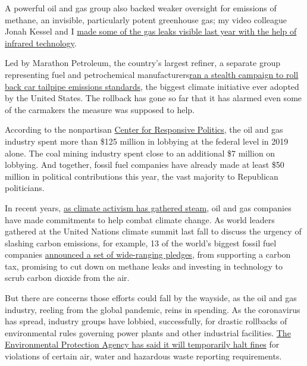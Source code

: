 A powerful oil and gas group also backed weaker oversight for emissions
of methane, an invisible, particularly potent greenhouse gas; my video
colleague Jonah Kessel and I
\href{https://www.nytimes3xbfgragh.onion/interactive/2019/12/12/climate/texas-methane-super-emitters.html}{made
some of the gas leaks visible last year with the help of infrared
technology}.

Led by Marathon Petroleum, the country's largest refiner, a separate
group representing fuel and petrochemical
manufacturers\href{https://www.nytimes3xbfgragh.onion/2018/12/13/climate/cafe-emissions-rollback-oil-industry.html}{ran
a stealth campaign to roll back car tailpipe emissions standards}, the
biggest climate initiative ever adopted by the United States. The
rollback has gone so far that it has alarmed even some of the carmakers
the measure was supposed to help.

According to the nonpartisan \href{https://www.opensecrets.org/}{Center
for Responsive Politics}, the oil and gas industry spent more than \$125
million in lobbying at the federal level in 2019 alone. The coal mining
industry spent close to an additional \$7 million on lobbying. And
together, fossil fuel companies have already made at least \$50 million
in political contributions this year, the vast majority to Republican
politicians.

In recent years,
\href{https://www.nytimes3xbfgragh.onion/2019/09/20/climate/global-climate-strike.html}{as
climate activism has gathered steam}, oil and gas companies have made
commitments to help combat climate change. As world leaders gathered at
the United Nations climate summit last fall to discuss the urgency of
slashing carbon emissions, for example, 13 of the world's biggest fossil
fuel companies
\href{https://www.nytimes3xbfgragh.onion/2019/09/23/climate/oil-industry-climate-investment.html}{announced
a set of wide-ranging pledges}, from supporting a carbon tax, promising
to cut down on methane leaks and investing in technology to scrub carbon
dioxide from the air.

But there are concerns those efforts could fall by the wayside, as the
oil and gas industry, reeling from the global pandemic, reins in
spending. As the coronavirus has spread, industry groups have lobbied,
successfully, for drastic rollbacks of environmental rules governing
power plants and other industrial facilities.
\href{https://www.nytimes3xbfgragh.onion/2020/03/26/climate/epa-coronavirus-pollution-rules.html}{The
Environmental Protection Agency has said it will temporarily halt fines}
for violations of certain air, water and hazardous waste reporting
requirements.

